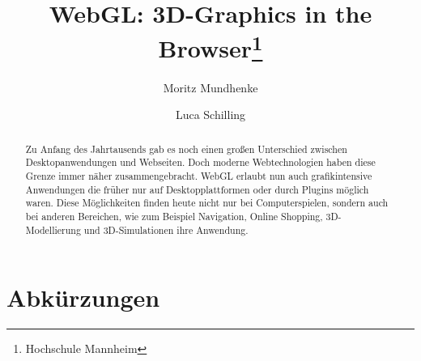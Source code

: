 \documentclass[runningheads]{llncs}
\begin{document}
%
\title{WebGL: 3D-Graphics in the Browser\thanks{Hochschule Mannheim}}
%
%
\author{Moritz Mundhenke \and
Luca Schilling}
%
%
%
\maketitle              %
%


\begin{abstract}
Zu Anfang des Jahrtausends gab es noch einen großen Unterschied zwischen Desktopanwendungen und Webseiten. Doch moderne Webtechnologien haben diese Grenze immer näher zusammengebracht. WebGL erlaubt nun auch grafikintensive Anwendungen die früher nur auf Desktopplattformen oder durch Plugins möglich waren. Diese Möglichkeiten finden heute nicht nur bei Computerspielen, sondern auch bei anderen Bereichen, wie zum Beispiel Navigation, Online Shopping, 3D-Modellierung und 3D-Simulationen ihre Anwendung.
\end{abstract}
%
%
%











\section*{Abkürzungen}
\begin{acronym}[Wasm]
\end{acronym}


{}

\end{document}
